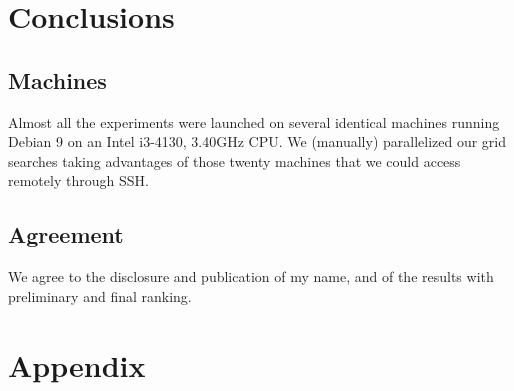 \section{Conclusions}

\subsection{Machines}
Almost all the experiments were launched on several identical machines running Debian 9 on an Intel i3-4130, 3.40GHz CPU. We (manually) parallelized our grid searches taking advantages of those twenty machines that we could access remotely through SSH.
 
\subsection{Agreement}
We agree to the disclosure and publication of my name, and of the results with preliminary and final ranking.

\section{Appendix}


